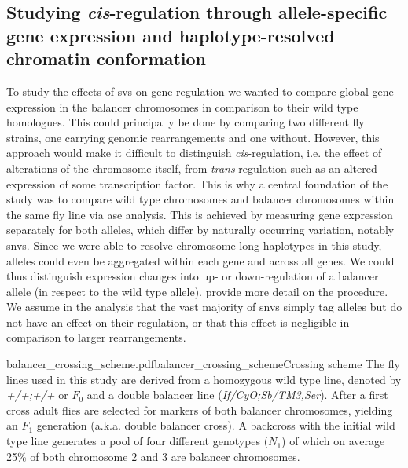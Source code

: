 \subsection{Studying \texorpdfstring{\textit{cis}}{cis}-regulation through
    allele-specific gene expression and haplotype-resolved chromatin conformation}
\label{sec:balancer_ase_motivation}

To study the effects of \acp{sv} on gene regulation we wanted to compare global
gene expression in the balancer chromosomes in comparison to their wild type
homologues. This could principally be done by comparing two different fly
strains, one carrying genomic rearrangements and one without. However, this
approach would make it difficult to distinguish \textit{cis}-regulation, i.e.
the effect of alterations of the chromosome itself, from
\textit{trans}-regulation such as an altered expression of some transcription
factor. This is why a central foundation of the study was to compare wild
type chromosomes and balancer chromosomes within the same fly line via \acf{ase} analysis.
This is achieved by measuring gene expression separately for both alleles, which
differ by naturally occurring variation, notably \acp{snv}. Since we were
able to resolve chromosome-long haplotypes in this study, alleles could even be
aggregated within each gene and across all genes. We could thus distinguish
expression changes into up- or down-regulation of a balancer allele (in respect
to the wild type allele). 
provide more detail on the procedure. We assume in the \ase analysis that the
vast majority of \acp{snv} simply tag alleles but do not have an effect on
their regulation, or that this effect is negligible in comparison
to larger rearrangements.

    {balancer_crossing_scheme.pdf}{balancer_crossing_scheme}{Crossing scheme}{
        The fly lines used in this study are derived from a homozygous wild type
        line, denoted by \textit{+/+;+/+} or $F_0$ and a double balancer line
        (\textit{If/CyO;Sb/TM3,Ser}). After a first cross adult flies are
        selected for markers of both balancer chromosomes, yielding an $F_1$
        generation (a.k.a. double balancer cross). A backcross with the initial
        wild type line generates a pool of four different genotypes ($N_1$)
        of which on average 25\% of both chromosome 2 and 3 are balancer
        chromosomes.}

